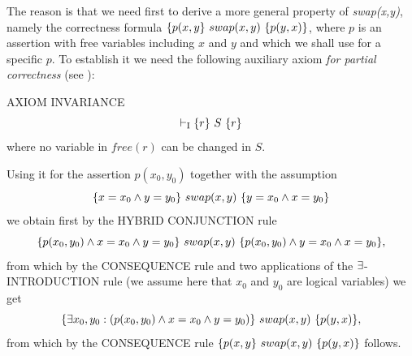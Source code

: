 \documentclass[runningheads]{llncs}       %
\begin{document}
The reason is that we need first to derive a more general property of
\emph{swap(x,y)}, namely the correctness formula
$\mbox{$\{{p(x,y}\}\ {swap(x,y)}\ \{{p(y,x)}\}$}$, where $p$ is an assertion with free
variables including $x$ and $y$ and which we shall use for a specific
$p$.  To establish it we need the following auxiliary axiom \emph{for
  partial correctness} (see \cite[page 98]{ABO09}):

\III

\NI
AXIOM INVARIANCE
\[ 
\vdash_{\mathrm{I}} \mbox{$\{{r}\}\ {S}\ \{{r}\}$}
\]
where no variable in $\mathit{free}(r)$ can be changed in $S$.
\III


Using it for the assertion $p(x_0,y_0)$
together with the assumption
\[
  \mbox{$\{{x=x_0 \wedge y=y_0}\}\ {swap(x,y)}\ \{{y=x_0 \wedge x=y_0}\}$}
\]
we obtain first by the HYBRID CONJUNCTION rule
\[
  \mbox{$\{{p(x_0,y_0) \wedge x=x_0 \wedge y=y_0}\}\ {swap(x,y)}\ \{{p(x_0,y_0) \wedge y=x_0 \wedge x=y_0}\}$},
\]
from which by the CONSEQUENCE rule and two applications of
the $\mbox{$\exists$}$-INTRODUCTION rule (we assume here that $x_0$ and $y_0$ are logical variables)
we get
\[
  \mbox{$\{{\mbox{$\exists$} x_0, y_0: (p(x_0,y_0) \wedge x=x_0 \wedge y=y_0)}\}\ {swap(x,y)}\ \{{p(y,x)}\}$},
\]
from which  by the CONSEQUENCE rule $\mbox{$\{{p(x,y}\}\ {swap(x,y)}\ \{{p(y,x)}\}$}$ follows.


\end{document}
